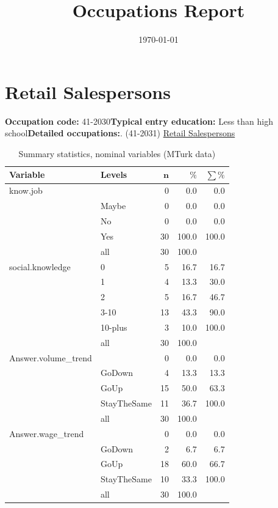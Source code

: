 \documentclass[a4paper,10pt]{article}\usepackage[]{graphicx}\usepackage[]{color}
\begin{document}
\title{Occupations Report}
\date{\today}
\maketitle





\section{Retail Salespersons}\textbf{Occupation code:} 41-2030\newline\textbf{Typical entry education:} Less than high school\newline\textbf{Detailed occupations:}. (41-2031)  \href{http://www.bls.gov/oes/current/oes412031.htm}{Retail Salespersons}\newline%
\begin{table}[ht]
\centering
{\footnotesize
\begin{tabular}{ll|rrr}
 \textbf{Variable} & \textbf{Levels} & $\mathbf{n}$ & $\mathbf{\%}$ & $\mathbf{\sum \%}$ \\ 
  \hline
know.job &  & 0 & 0.0 & 0.0 \\ 
   & Maybe & 0 & 0.0 & 0.0 \\ 
   & No & 0 & 0.0 & 0.0 \\ 
   & Yes & 30 & 100.0 & 100.0 \\ 
   \hline
 & all & 30 & 100.0 &  \\ 
   \hline
\hline
social.knowledge & 0 & 5 & 16.7 & 16.7 \\ 
   & 1 & 4 & 13.3 & 30.0 \\ 
   & 2 & 5 & 16.7 & 46.7 \\ 
   & 3-10 & 13 & 43.3 & 90.0 \\ 
   & 10-plus & 3 & 10.0 & 100.0 \\ 
   \hline
 & all & 30 & 100.0 &  \\ 
   \hline
\hline
Answer.volume\_trend &  & 0 & 0.0 & 0.0 \\ 
   & GoDown & 4 & 13.3 & 13.3 \\ 
   & GoUp & 15 & 50.0 & 63.3 \\ 
   & StayTheSame & 11 & 36.7 & 100.0 \\ 
   \hline
 & all & 30 & 100.0 &  \\ 
   \hline
\hline
Answer.wage\_trend &  & 0 & 0.0 & 0.0 \\ 
   & GoDown & 2 & 6.7 & 6.7 \\ 
   & GoUp & 18 & 60.0 & 66.7 \\ 
   & StayTheSame & 10 & 33.3 & 100.0 \\ 
   \hline
 & all & 30 & 100.0 &  \\ 
   \hline
\hline
\end{tabular}
}
\caption{Summary statistics, nominal variables (MTurk data)} 
\label{tab1:41-2030}
\end{table}
\end{document}
